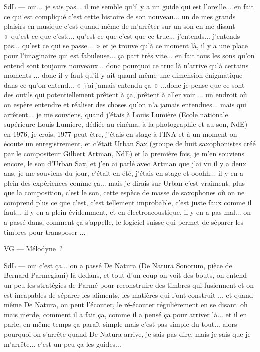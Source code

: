 SdL — oui... je sais pas... il me semble qu'il y a un guide qui est l'oreille... en fait ce qui est compliqué c'est cette histoire de son nouveau... un de mes grands plaisirs en musique c'est quand même de m'arrêter sur un son en me disant « qu'est ce que c'est.... qu'est ce que c'est que ce truc... j'entends... j'entends pas... qu'est ce qui se passe... » et je trouve qu'à ce moment là, il y a une place pour l'imaginaire qui est fabuleuse... ça part très vite... en fait tous les sons qu'on entend sont toujours nouveaux... donc pourquoi ce truc là n'arrive qu'à certains moments ... donc il y faut qu'il y ait quand même une dimension énigmatique dans ce qu'on entend... « j'ai jamais entendu ça » ...donc je pense que ce sont des outils qui potentiellement prêtent à ça, prêtent à aller voir ... un endroit où on espère entendre et réaliser des choses qu'on n'a jamais entendues... mais qui arrêtent... je me souviens, quand j'étais à Louis Lumière (Ecole nationale supérieure Louis-Lumiere, dédiée au cinéma, à la photographie et au son, NdE) en 1976, je crois, 1977 peut-être, j'étais en stage à l'INA et à un moment on écoute un enregistrement, et c'était Urban Sax (groupe de huit saxophonistes créé par le compositeur Gilbert Artman, NdE) et la première fois, je m'en souviens encore, le son d'Urban Sax, et j'en ai parlé avec Artman que j'ai vu il y a deux ans, je me souviens du jour, c'était en été, j'étais en stage et ooohh... il y en a plein des expériences comme ça... mais je dirais sur Urban c'est vraiment, plus que la composition, c'est le son, cette espèce de masse de saxophones où on ne comprend plus ce que c'est, c'est tellement improbable, c'est juste faux comme il faut... il y en a plein évidemment, et en électroacoustique, il y en a pas mal... on a passé dans, comment ça s'appelle, le logiciel suisse qui permet de séparer les timbres pour transposer ... 

VG — Mélodyne ? 

SdL — oui c'est ça... on a passé De Natura (De Natura Sonorum, pièce de Bernard Parmegiani) là dedans, et tout d'un coup on voit des bouts, on entend un peu les stratégies de Parmé pour reconstruire des timbres qui fusionnent et on est incapables de séparer les aliments, les matières qui l'ont construit ... et quand même De Natura, on peut l'écouter, le ré-écouter régulièrement en se disant oh mais merde, comment il a fait ça, comme il a pensé ça pour arriver là... et il en parle, en même temps ça paraît simple mais c'est pas simple du tout... alors pourquoi on s'arrête quand De Natura arrive, je sais pas dire, mais je sais que je m'arrête... c'est un peu ça les guides... 

